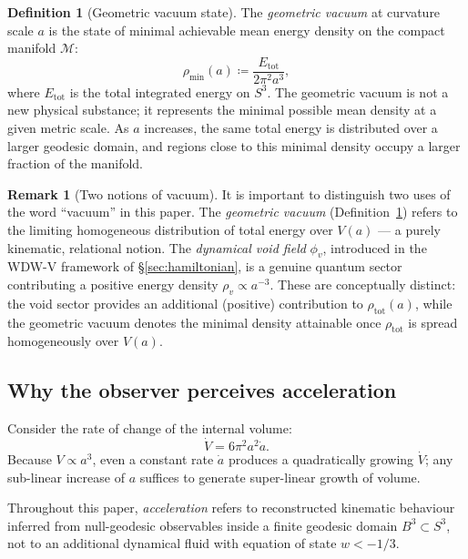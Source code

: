 \documentclass[12pt,a4paper]{article}
\theoremstyle{plain}
\theoremstyle{definition}
\newtheorem{definition}[theorem]{Definition}
\newtheorem{remark}[theorem]{Remark}
\newcommand{\defeq}{\coloneqq}
\newcommand{\Mth}{\mathcal{M}}
\begin{document}
\begin{definition}[Geometric vacuum state]
\label{def:geometric_vacuum}
The \emph{geometric vacuum} at curvature scale $a$ is the state of
minimal achievable mean energy density on the compact manifold $\Mth$:
\begin{equation}
  \rho_{\min}(a) \defeq \frac{E_{\mathrm{tot}}}{2\pi^2 a^3},
  \label{eq:rho_min}
\end{equation}
where $E_{\mathrm{tot}}$ is the total integrated energy on $S^3$.
The geometric vacuum is not a new physical substance; it represents the
minimal possible mean density at a given metric scale. As $a$ increases,
the same total energy is distributed over a larger geodesic domain, and
regions close to this minimal density occupy a larger fraction of the
manifold.
\end{definition}

\begin{remark}[Two notions of vacuum]
It is important to distinguish two uses of the word ``vacuum'' in this
paper. The \emph{geometric vacuum} (Definition~\ref{def:geometric_vacuum})
refers to the limiting homogeneous distribution of total energy over
$V(a)$ --- a purely kinematic, relational notion.
The \emph{dynamical void field} $\phi_v$, introduced in the WDW-V framework
of \S\ref{sec:hamiltonian}, is a genuine quantum sector contributing a
positive energy density $\rho_v\propto a^{-3}$.
These are conceptually distinct: the void sector provides an additional
(positive) contribution to $\rho_{\mathrm{tot}}(a)$, while the geometric
vacuum denotes the minimal density attainable once $\rho_{\mathrm{tot}}$
is spread homogeneously over $V(a)$.
\end{remark}

\subsection{Why the observer perceives acceleration}

Consider the rate of change of the internal volume:
\begin{equation}
  \dot V = 6\pi^2 a^2\dot a.
  \label{eq:Vdot}
\end{equation}
Because $V\propto a^3$, even a constant rate $\dot a$ produces a
quadratically growing $\dot V$; any sub-linear increase of $a$ suffices
to generate super-linear growth of volume.

\begin{keybox}
Throughout this paper, \emph{acceleration} refers to reconstructed
kinematic behaviour inferred from null-geodesic observables inside a
finite geodesic domain $B^3\subset S^3$, not to an additional dynamical
fluid with equation of state $w < -1/3$.
\end{keybox}
\end{document}
